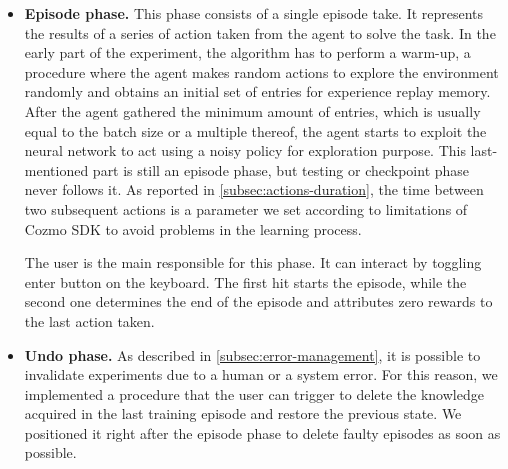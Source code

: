 \begin{itemize}
    \item \textbf{Episode phase.} This phase consists of a single episode take.
          It represents the results of a series of action taken from the agent to solve the task.
          In the early part of the experiment, the algorithm has to perform a warm-up, a procedure where the agent makes random actions to explore the environment randomly and obtains an initial set of entries for experience replay memory.
          After the agent gathered the minimum amount of entries, which is usually equal to the batch size or a multiple thereof, the agent starts to exploit the neural network to act using a noisy policy for exploration purpose.
          This last-mentioned part is still an episode phase, but testing or checkpoint phase never follows it.
          As reported in \vref{subsec:actions-duration}, the time between two subsequent actions is a parameter we set according to limitations of Cozmo SDK to avoid problems in the learning process.

          The user is the main responsible for this phase.
          It can interact by toggling enter button on the keyboard.
          The first hit starts the episode, while the second one determines the end of the episode and attributes zero rewards to the last action taken.

    \item \textbf{Undo phase.} As described in \vref{subsec:error-management}, it is possible to invalidate experiments due to a human or a system error.
          For this reason, we implemented a procedure that the user can trigger to delete the knowledge acquired in the last training episode and restore the previous state.
          We positioned it right after the episode phase to delete faulty episodes as soon as possible.


\end{itemize}
